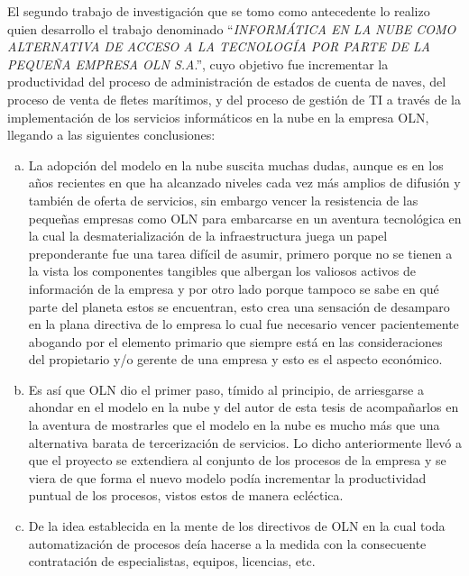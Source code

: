 El segundo trabajo de investigaci\'on que se tomo como antecedente lo realizo
\citep{jcampos} quien desarrollo el trabajo denominado ``\emph{INFORM\'ATICA EN LA NUBE
COMO ALTERNATIVA DE ACCESO A LA TECNOLOG\'IA POR PARTE DE LA PEQUE\~NA EMPRESA
OLN S.A}.'', cuyo objetivo fue incrementar la productividad del proceso de
administraci\'on de estados de cuenta de naves, del proceso de venta de fletes
mar\'itimos, y del proceso de gesti\'on de TI a trav\'es de la implementaci\'on
de los servicios inform\'aticos en la nube en la empresa OLN, llegando a las
siguientes conclusiones:
\begin{enumerate}[a.]
    \item La adopci\'on del modelo en la nube suscita muchas dudas, aunque es en
          los a\~nos recientes en que ha alcanzado niveles cada vez m\'as amplios
          de difusi\'on y tambi\'en de oferta de servicios, sin embargo vencer la
          resistencia de las peque\~nas empresas como OLN para embarcarse en un
          aventura tecnol\'ogica en la cual la desmaterializaci\'on de la
          infraestructura juega un papel preponderante fue una tarea dif\'icil
          de asumir, primero porque no se tienen a la vista los componentes
          tangibles que albergan los valiosos activos de informaci\'on de la
          empresa y por otro lado porque tampoco se sabe en qu\'e parte del
          planeta estos se encuentran, esto crea una sensaci\'on de desamparo en
          la plana directiva de lo empresa lo cual fue necesario vencer
          pacientemente abogando por el elemento primario que siempre est\'a en
          las consideraciones del propietario y/o gerente de una empresa y esto
          es el aspecto econ\'omico.
    \item Es as\'i que OLN dio el primer paso, t\'imido al principio, de arriesgarse
          a ahondar en el modelo en la nube y del autor de esta tesis de acompa\~narlos
          en la aventura de mostrarles que el modelo en la nube es mucho m\'as
          que una alternativa barata de tercerizaci\'on de servicios. Lo dicho
          anteriormente llev\'o a que el proyecto se extendiera al conjunto de
          los procesos de la empresa y se viera de que forma el nuevo modelo
          pod\'ia incrementar la productividad puntual de los procesos, vistos
          estos de manera ecl\'ectica.
    \item De la idea establecida en la mente de los directivos de OLN en la cual
          toda automatizaci\'on de procesos de\'ia hacerse a la medida con la
          consecuente contrataci\'on de especialistas, equipos, licencias, etc.

\end{enumerate}
